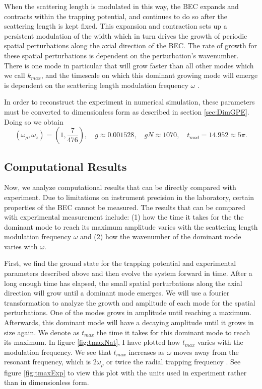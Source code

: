 \documentclass[12]{article}
\begin{document}
When the scattering length is modulated in this way, the BEC expands and contracts within the trapping potential, and continues to do so after the scattering length is kept fixed. This expansion and contraction sets up a persistent modulation of the width which in turn drives the growth of periodic spatial perturbations along the axial direction of the BEC. The rate of growth for these spatial perturbations is dependent on the perturbation's wavenumber. There is one mode in particular that will grow faster than all other modes which we call $k_{max}$, and the timescale on which this dominant growing mode will emerge is dependent on the scattering length modulation frequency $\omega$ \cite{mustafa}.

In order to reconstruct the experiment in numerical simulation, these parameters must be converted to dimensionless form as described in section \ref{sec:DimGPE}. Doing so we obtain
\begin{equation}
\left(\omega_\rho, \omega_z\right)=(1 , \textstyle\frac{7}{476}), \quad g \approx 0.001528, \quad gN \approx 1070, \quad t_{mod} = 14.952 \approx 5\pi.
\end{equation}

\subsection{Computational Results}

Now, we analyze computational results that can be directly compared with experiment. Due to limitations on instrument precision in the laboratory, certain properties of the BEC cannot be measured. The results that can be compared with experimental measurement include: (1) how the time it takes for the the dominant mode to reach its maximum amplitude varies with the scattering length modulation frequency $\omega$ and (2) how the wavenumber of the dominant mode varies with $\omega$.

First, we find the ground state for the trapping potential and experimental parameters described above and then evolve the system forward in time. After a long enough time has elapsed, the small spatial perturbations along the axial direction will grow until a dominant mode emerges. We will use a fourier transformation to analyze the growth and amplitude of each mode for the spatial perturbations. One of the modes grows in amplitude until reaching a maximum. Afterwards, this dominant mode will have a decaying amplitude until it grows in size again. We denote as $t_{max}$ the time it takes for this dominant mode to reach its maximum. In figure \ref{fig:tmaxNat}, I have plotted how $t_{max}$ varies with the modulation frequency. We see that $t_{max}$ increases as $\omega$ moves away from the resonant frequency, which is $2\omega_\rho$ or twice the radial trapping frequency \cite{mustafa}. See figure \ref{fig:tmaxExp} to view this plot with the units used in experiment rather than in dimensionless form.
\end{document}
